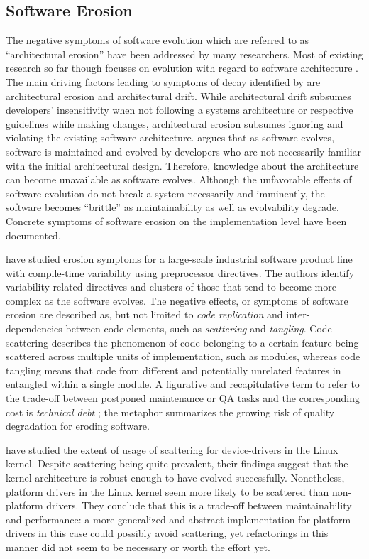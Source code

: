 \subsection{Software Erosion}
The negative symptoms of software evolution which are referred to as
``architectural erosion'' \citep{breivold_systematic_2012} have
been addressed by many researchers.
Most of existing research so far though focuses on evolution with regard to
software architecture \citep{breivold_systematic_2012}. The main driving factors leading to symptoms of decay
identified by \cite{perry_software_1991} are architectural erosion and
architectural drift. While architectural drift subsumes developers'
insensitivity when not following a systems architecture or respective guidelines while making changes, architectural erosion subsumes ignoring and violating the existing software
architecture. \cite{parnas_software_1994} argues that as software evolves, software is maintained
and evolved by developers who are not necessarily familiar with the initial
architectural design. Therefore, knowledge about the architecture can become
unavailable as software evolves. Although the unfavorable effects of software
evolution do not break a system necessarily and imminently, the software becomes ``brittle'' \citep{perry_software_1991}
as maintainability as well as evolvability degrade. Concrete  symptoms of software
erosion on the implementation level have been documented. 

\cite{zhang_variability_2013} have studied erosion symptoms for a large-scale
industrial software product line with compile-time variability using
preprocessor directives.
The authors identify variability-related directives and clusters of those that
tend to become more complex as the software evolves. The negative effects, or symptoms of software
erosion are described as, but not limited to \emph{code replication} and
inter-dependencies between code elements, such as \emph{scattering} and
\emph{tangling}. Code scattering describes the phenomenon of code belonging to
a certain feature being scattered across multiple units of implementation,
such as modules, whereas code tangling means that code from different and
potentially unrelated features in entangled within a single module. A figurative
and recapitulative term to refer to the trade-off between postponed maintenance
or QA tasks and the corresponding cost is \emph{technical debt}
\cite{guo_tracking_2011}; the metaphor summarizes the growing risk of quality degradation for eroding software.

\cite{passos_feature_2015} have studied the extent of usage of scattering for device-drivers
in the Linux kernel. Despite scattering being quite prevalent, their
findings suggest that the kernel architecture is robust enough to have evolved
successfully. Nonetheless, platform drivers in the Linux kernel seem more
likely to be scattered than non-platform drivers. They conclude that this is a
trade-off between maintainability and performance: a more generalized and
abstract implementation for platform-drivers in this case could possibly avoid
scattering, yet refactorings in this manner did not seem to be necessary or
worth the effort yet. 


